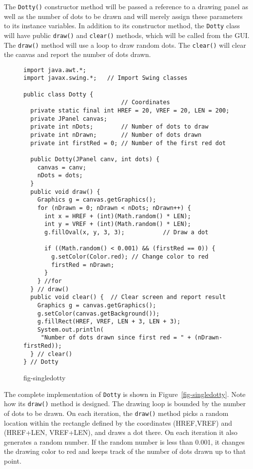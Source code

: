 The {\tt Dotty()} constructor method will be passed a reference to a
drawing panel as well as the number of dots to be drawn and will
merely assign these parameters to its instance variables.   In addition
to its constructor method, the {\tt Dotty} class will have public
{\tt draw()} and {\tt clear()} methods, which will be called from the
GUI.   The {\tt draw()} method will use a loop to draw random
dots.  The {\tt clear()} will clear the canvas and report the
number of dots drawn.

\begin{figure}[h!]
\jjjprogstart
\begin{jjjlisting}[30pc]
\begin{lstlisting}
import java.awt.*;
import javax.swing.*;   // Import Swing classes

public class Dotty {
                            // Coordinates
  private static final int HREF = 20, VREF = 20, LEN = 200; 
  private JPanel canvas;
  private int nDots;        // Number of dots to draw
  private int nDrawn;       // Number of dots drawn
  private int firstRed = 0; // Number of the first red dot

  public Dotty(JPanel canv, int dots) {
    canvas = canv;
    nDots = dots;
  }
  public void draw() {
    Graphics g = canvas.getGraphics();
    for (nDrawn = 0; nDrawn < nDots; nDrawn++) {
      int x = HREF + (int)(Math.random() * LEN);
      int y = VREF + (int)(Math.random() * LEN);
      g.fillOval(x, y, 3, 3);           // Draw a dot

      if ((Math.random() < 0.001) && (firstRed == 0)) {
        g.setColor(Color.red); // Change color to red
        firstRed = nDrawn;
      }
    } //for
  } // draw()
  public void clear() {  // Clear screen and report result
    Graphics g = canvas.getGraphics();
    g.setColor(canvas.getBackground());
    g.fillRect(HREF, VREF, LEN + 3, LEN + 3);
    System.out.println(
     "Number of dots drawn since first red = " + (nDrawn-firstRed));
  } // clear()
} // Dotty
\end{lstlisting}
\end{jjjlisting}
{fig-singledotty}
\end{figure}

The complete implementation of {\tt Dotty} is shown in
Figure~\ref{fig-singledotty}. Note how its {\tt draw()} method is
designed.  The drawing loop is bounded by the number of dots to be
drawn.  On each iteration, the {\tt draw()} method picks a
random location within the rectangle defined by the coordinates
(HREF,VREF) and (HREF+LEN, VREF+LEN), and draws a dot there.   On each
iteration it also generates a random number.  If the random number is
less than 0.001, it changes the drawing color to red and keeps track
of the number of dots drawn up to that point.

